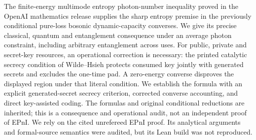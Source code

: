 The finite-energy multimode entropy photon-number inequality proved in
the OpenAI mathematics release supplies the sharp entropy premise in the
previously conditional pure-loss bosonic dynamic-capacity converses.
We give its precise classical, quantum and entanglement consequence under an
average photon constraint, including arbitrary entanglement across uses.
For public, private and secret-key resources, an operational correction is
necessary: the printed catalytic secrecy condition of Wilde--Hsieh
protects consumed key jointly with generated secrets and excludes the
one-time pad. A zero-energy converse disproves the displayed region
under that literal condition. We establish the formula with an explicit
generated-secret secrecy criterion, corrected converse accounting, and
direct key-assisted coding. The formulas and original conditional
reductions are inherited; this is a consequence and operational audit,
not an independent proof of EPnI. We rely on the cited unrefereed EPnI
proof. Its analytical arguments and formal-source semantics were
audited, but its Lean build was not reproduced.
